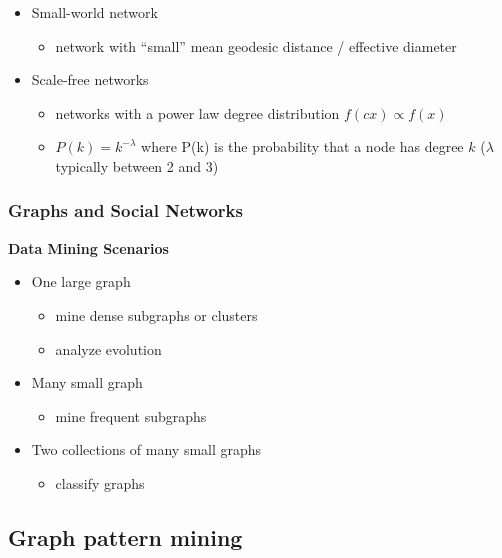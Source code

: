 \documentclass[../notes.tex]{subfiles}
\begin{document}
\begin{itemize}
  \newpage
  
  \item Small-world network
  \begin{itemize}
    \item network with ``small'' mean geodesic distance / effective diameter
  \end{itemize}

  \item Scale-free networks
  \begin{itemize}
    \item networks with a power law degree distribution $f(cx) \propto f(x)$
    \item $P(k) = k^{-\lambda}$ where P(k) is the probability that a node has degree $k$ ($\lambda$ typically between 2 and 3)
  \end{itemize}
\end{itemize}

\subsubsection{Graphs and Social Networks}
\textbf{Data Mining Scenarios}
\begin{itemize}
  \item One large graph
  \begin{itemize}
    \item mine dense subgraphs or clusters
    \item analyze evolution
  \end{itemize}

  \item Many small graph
  \begin{itemize}
    \item mine frequent subgraphs
  \end{itemize}

  \item Two collections of many small graphs
  \begin{itemize}
    \item classify graphs
  \end{itemize}

\end{itemize}

\subsection{Graph pattern mining}
\end{document}
